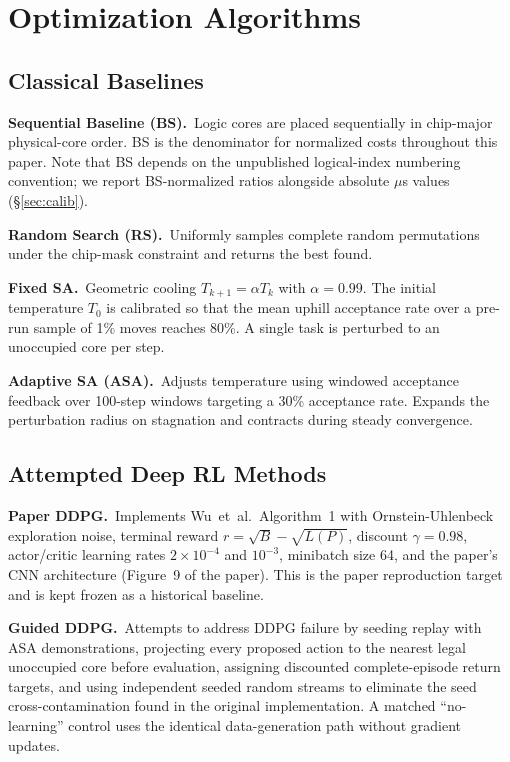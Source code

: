 \documentclass[10pt,conference]{IEEEtran}
\begin{document}
\section{Optimization Algorithms}
\label{sec:algos}

\subsection{Classical Baselines}
\label{sec:baselines}

\textbf{Sequential Baseline (BS).}\ Logic cores are placed sequentially in
chip-major physical-core order.  BS is the denominator for normalized costs
throughout this paper.  Note that BS depends on the unpublished logical-index
numbering convention; we report BS-normalized ratios alongside absolute $\mu$s
values (\S\ref{sec:calib}).

\textbf{Random Search (RS).}\ Uniformly samples complete random permutations
under the chip-mask constraint and returns the best found.

\textbf{Fixed SA.}\ Geometric cooling $T_{k+1} = \alpha T_k$ with
$\alpha = 0.99$.  The initial temperature $T_0$ is calibrated so that the
mean uphill acceptance rate over a pre-run sample of 1\% moves reaches 80\%.
A single task is perturbed to an unoccupied core per step.

\textbf{Adaptive SA (ASA).}\ Adjusts temperature using windowed acceptance
feedback over 100-step windows targeting a 30\% acceptance rate.  Expands the
perturbation radius on stagnation and contracts during steady convergence.

\subsection{Attempted Deep RL Methods}
\label{sec:neg-ddpg}

\textbf{Paper DDPG.}\ Implements Wu~et~al.~Algorithm~1 with Ornstein-Uhlenbeck
exploration noise, terminal reward $r = \sqrt{B} - \sqrt{L(P)}$, discount
$\gamma = 0.98$, actor/critic learning rates $2{\times}10^{-4}$ and $10^{-3}$,
minibatch size 64, and the paper's CNN architecture (Figure~9 of the paper).
This is the paper reproduction target and is kept frozen as a historical baseline.

\textbf{Guided DDPG.}\ Attempts to address DDPG failure by seeding replay with
ASA demonstrations, projecting every proposed action to the nearest legal
unoccupied core before evaluation, assigning discounted complete-episode return
targets, and using independent seeded random streams to eliminate the seed
cross-contamination found in the original implementation.  A matched
``no-learning'' control uses the identical data-generation path without gradient
updates.
\end{document}
